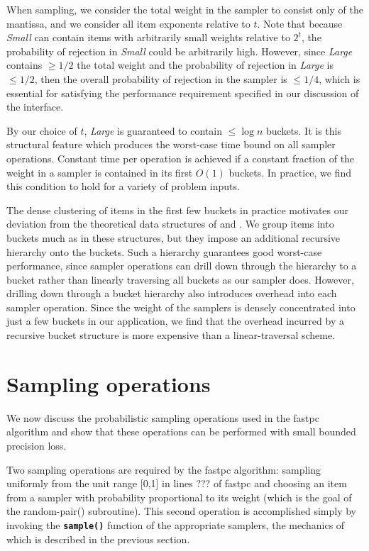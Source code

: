 \documentclass[11pt]{article}
\newcommand{\smallset}{\emph{Small }}
\newcommand{\largeset}{\emph{Large }}
\newcommand{\func}[1]{{\bf\texttt{#1}}}
\begin{document}
When sampling, we consider the total weight in the sampler to consist only of 
the mantissa, and we consider all item exponents relative to $t$.  
Note that because \smallset can contain items with arbitrarily small
weights relative to $2^t$, the probability of rejection in \smallset could be 
arbitrarily high. However, since \largeset contains $\ge 1/2$ the total weight 
and the  probability of rejection in \largeset is $\le 1/2$, then the overall 
probability of rejection in the sampler is $\le 1/4$, which is essential for
 satisfying the performance requirement specified in our discussion of the 
interface.  

By our choice of $t$, \largeset is guaranteed to contain 
$\le \log n$ buckets. It is this structural feature which produces the
worst-case time bound on all sampler operations. Constant time per operation
is achieved if a constant fraction of the
weight in a sampler is contained in its first $O(1)$ buckets. In 
practice, we find this condition to hold for a variety of problem inputs.

The dense clustering of items in the first few buckets in practice motivates our
deviation from the theoretical data structures of \cite{hagerup1993} and
\cite{matias1993}. We group items into buckets much as in these structures,
but they 
impose an additional recursive hierarchy onto the buckets.  
Such a hierarchy guarantees good
worst-case performance, since sampler operations can drill down through the 
hierarchy to a bucket rather than linearly traversing all buckets as our
sampler does.  However, drilling down through a bucket hierarchy also 
introduces overhead into each
sampler operation.  Since the weight of the samplers is densely
concentrated into just a few buckets in our application, we find that the 
overhead incurred by a recursive bucket structure is more expensive than a 
linear-traversal scheme.

\section{Sampling operations} \label{sec:samplerOps}
We now discuss the probabilistic sampling operations used in the fastpc algorithm and show that these operations can be performed with small bounded precision loss.


Two sampling operations are required by the fastpc algorithm: sampling uniformly from the unit range [0,1] in lines ??? of fastpc and choosing an item from a sampler with probability proportional to its weight (which is the goal of the random-pair() subroutine).  This second operation is accomplished simply by invoking the \func{sample()} function of the appropriate samplers, the mechanics of which is described in the previous section.
\end{document}
